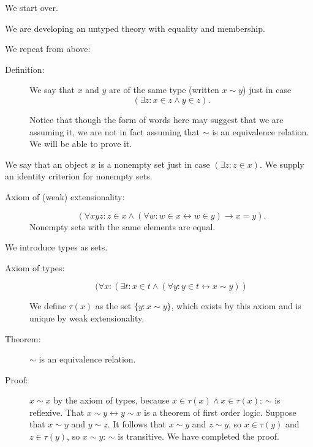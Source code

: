 \documentclass{slides}
\begin{document}
\begin{slide}

{\Large We start over.}

We are developing an untyped theory with equality and membership.

We repeat from above:

\begin{description}

\item[Definition:]   We say that $x$ and $y$ are of the same type (written $x \sim y$) just in case $$(\exists z:x \in z \wedge y \in z).$$

Notice that though the form of words here may suggest that we are assuming it, we are not in fact assuming that $\sim$ is an equivalence relation.  We will be able to prove it.

\end{description}

\end{slide}

\begin{slide}



We say that an object $x$ is a nonempty set just in case $(\exists z:z \in x)$.  We supply an identity criterion for nonempty sets.

\begin{description}

\item[Axiom of (weak) extensionality:]  $$(\forall xyz: z \in x \wedge (\forall w:w \in x \leftrightarrow w \in y) \rightarrow x=y).$$ Nonempty sets with the same elements are equal.

\end{description}

\end{slide}

\begin{slide}

We introduce types as sets.

\begin{description}

\item[Axiom of types:]  $$(\forall x:(\exists t:x \in t \wedge (\forall y:y \in t \leftrightarrow x \sim y))$$

We define $\tau(x)$ as the set $\{y:x \sim y\}$, which exists by this axiom and is unique by weak extensionality.

\item[Theorem:]  $\sim$ is an equivalence relation.

\item[Proof:]  $x \sim x$ by the axiom of types, because $x \in \tau(x) \wedge x \in \tau(x)$:  $\sim $ is reflexive.  That $x \sim y \leftrightarrow y \sim x$ is a theorem of first order logic.  Suppose that $x \sim y$ and $y \sim z$.  It follows that
$x \sim y$ and $z \sim y$, so $x \in \tau(y)$ and $z \in \tau(y)$, so $x \sim y$:  $\sim$ is transitive.  We have completed the proof.

\end{description}

\end{slide}
\end{document}
